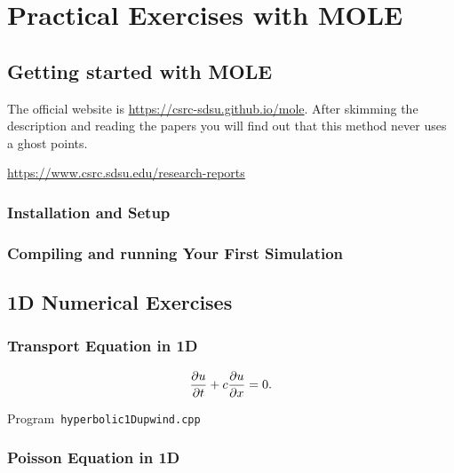 \part{Practical Exercises with MOLE}

\chapter{Getting started with MOLE}

The official website is \url{https://csrc-sdsu.github.io/mole}.
After skimming the description and reading the papers you will find
out that this method never uses a ghost points.

\url{https://www.csrc.sdsu.edu/research-reports}

\section{Installation and Setup}

\section{Compiling and running Your First Simulation}


\chapter{1D Numerical Exercises}

\section{Transport Equation in 1D}

\begin{equation*}
    \diffp{u}{t}+c\diffp{u}{x}=
    0.
\end{equation*}

\begin{listing}[ht!]
    \tiny
    \centering
    \caption{Program~\texttt{hyperbolic1Dupwind.cpp}}
    \label{code:hyperbolic1Dupwind.cpp}
\end{listing}

\section{Poisson Equation in 1D}

